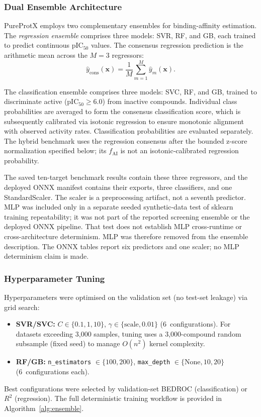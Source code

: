 \documentclass[conference]{IEEEtran}
\newcommand{\rev}[2]{#2}
\begin{document}
\subsubsection{Dual Ensemble Architecture}
PureProtX employs two complementary ensembles for
binding-affinity estimation.
The \emph{regression ensemble} comprises \rev{R2.1}{three models: SVR, RF, and GB}, each trained to predict continuous
pIC$_{50}$ values.
The consensus regression prediction is the arithmetic
mean across the $\rev{R2.1}{M{=}3}$ regressors:
\begin{equation}
\label{eq:consensus-reg}
\hat{y}_{\mathrm{cons}}(\mathbf{x})
  = \frac{1}{M}\sum_{m=1}^{M}\hat{y}_m(\mathbf{x}).
\end{equation}

The classification ensemble comprises three models:
SVC, RF, and GB, trained to discriminate active
(pIC$_{50} \geq 6.0$) from inactive compounds.
Individual class probabilities are averaged to form the
consensus classification score, which is subsequently
calibrated via isotonic regression to ensure monotonic
alignment with observed activity rates.
\rev{R2.3}{Classification probabilities are evaluated separately.
The hybrid benchmark uses the regression consensus after the
bounded z-score normalization specified below; its $f_{\mathrm{AI}}$
is not an isotonic-calibrated regression probability.}

\rev{R2.1}{The saved ten-target benchmark results contain these
three regressors, and the deployed ONNX manifest contains their
exports, three classifiers, and one StandardScaler. The scaler is
a preprocessing artifact, not a seventh predictor. MLP was included
only in a separate seeded synthetic-data test of sklearn training
repeatability; it was not part of the reported screening ensemble
or the deployed ONNX pipeline. That test does not establish MLP
cross-runtime or cross-architecture determinism. MLP was therefore removed from the ensemble description. The ONNX tables report six
predictors and one scaler; no MLP determinism claim is made.}

\subsubsection{Hyperparameter Tuning}
Hyperparameters were optimised on the validation set
(no test-set leakage) via grid search:
\begin{itemize}
    \item \textbf{SVR/SVC:} $C \in \{0.1, 1, 10\}$,
    $\gamma \in \{\mathrm{scale}, 0.01\}$ (6~configurations).
    For datasets exceeding 3{,}000 samples, tuning uses
    a 3{,}000-compound random subsample (fixed seed) to
    manage $O(n^2)$ kernel complexity.
    \item \textbf{RF/GB:} \texttt{n\_estimators}
    $\in \{100, 200\}$, \texttt{max\_depth}
    $\in \{\mathrm{None}, 10, 20\}$ (6~configurations each).
\end{itemize}
Best configurations were selected by validation-set BEDROC
(classification) or $R^2$ (regression).
The full deterministic training workflow is provided
in Algorithm~\ref{alg:ensemble}.
\end{document}
